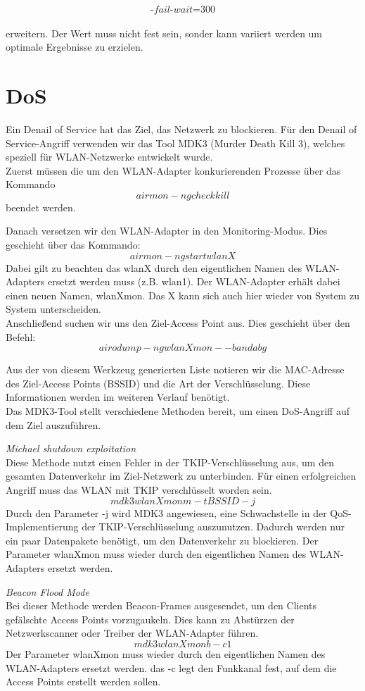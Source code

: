 $$\text{-}fail\text{-}wait\text{=}300$$\\

erweitern. Der Wert muss nicht fest sein, sonder kann variiert werden um optimale Ergebnisse zu erzielen. 

\section{DoS}
Ein Denail of Service hat das Ziel, das Netzwerk zu blockieren. 
Für den Denail of Service-Angriff verwenden wir das Tool MDK3 (Murder Death Kill 3), welches speziell für WLAN-Netzwerke entwickelt wurde. 
\\
Zuerst müssen die um den WLAN-Adapter konkurierenden Prozesse über das Kommando 
$$airmon-ng check kill$$
beendet werden. 

Danach versetzen wir den WLAN-Adapter in den Monitoring-Modus. Dies geschieht über das Kommando: 
$$airmon-ng start wlanX$$
Dabei gilt zu beachten das wlanX durch den eigentlichen Namen des WLAN-Adapters ersetzt werden muss (z.B. wlan1). 
Der WLAN-Adapter erhält dabei einen neuen Namen, wlanXmon. Das X kann sich auch hier wieder von System zu System unterscheiden. 
\\
Anschließend suchen wir uns den Ziel-Access Point aus. Dies geschieht über den Befehl: 
$$airodump-ng wlanXmon --band abg$$

Aus der von diesem Werkzeug generierten Liste notieren wir die MAC-Adresse des Ziel-Access Points (BSSID) und die Art der Verschlüsselung. Diese Informationen werden im weiteren Verlauf benötigt. 
\\
Das MDK3-Tool stellt verschiedene Methoden bereit, um einen DoS-Angriff auf dem Ziel auszuführen. 

\textit{Michael shutdown exploitation}\\
Diese Methode nutzt einen Fehler in der TKIP-Verschlüsselung aus, um den gesamten Datenverkehr im Ziel-Netzwerk zu unterbinden. Für einen erfolgreichen Angriff muss das WLAN mit TKIP verschlüsselt worden sein.\\
$$mdk3 wlanXmon m -t BSSID -j$$
Durch den Parameter -j wird MDK3 angewiesen, eine Schwachstelle in der QoS-Implementierung der TKIP-Verschlüsselung auszunutzen. Dadurch werden nur ein paar Datenpakete benötigt, um den Datenverkehr zu blockieren.
Der Parameter wlanXmon muss wieder durch den eigentlichen Namen des WLAN-Adapters ersetzt werden. 

\textit{Beacon Flood Mode}\\
Bei dieser Methode werden Beacon-Frames ausgesendet, um den Clients gefälschte Access Points vorzugaukeln. Dies kann zu Abstürzen der Netzwerkscanner oder Treiber der WLAN-Adapter führen. 
$$mdk3 wlanXmon b -c 1$$
Der Parameter wlanXmon muss wieder durch den eigentlichen Namen des WLAN-Adapters ersetzt werden.
das -c legt den Funkkanal fest, auf dem die Access Points erstellt werden sollen. 

